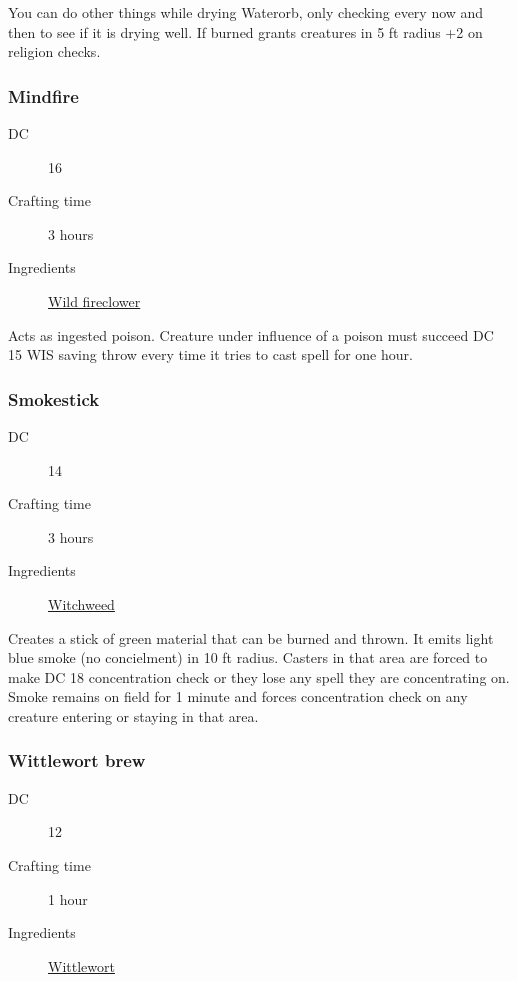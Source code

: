 You can do other things while drying Waterorb, only checking every now and then to see if it is drying well.
 If burned grants creatures in 5 ft radius +2 on religion checks.

\subsubsection{Mindfire}
\label{Mindfire}

\begin{description}
\item [DC] 16
\item [Crafting time] 3 hours
\item [Ingredients] \hyperref[Wild Fireclover]{Wild fireclower}
\end{description}

Acts as ingested poison. Creature under influence of a poison must succeed DC 15 WIS 
saving throw every time it tries to cast spell for one hour.

\subsubsection{Smokestick}
\label{Smokestick}

\begin{description}
\item [DC] 14
\item [Crafting time] 3 hours
\item [Ingredients] \hyperref[Witchweed]{Witchweed}
\end{description}

Creates a stick of green material that can be burned and thrown. It emits light blue smoke 
(no concielment) in 10 ft radius. Casters in that area are forced to make DC 18 concentration check 
or they lose any spell they are concentrating on. 
Smoke remains on field for 1 minute and forces concentration check on any creature entering or staying in that area.

\subsubsection{Wittlewort brew}
\label{Wittlewort brew}

\begin{description}
\item [DC] 12
\item [Crafting time] 1 hour
\item [Ingredients] \hyperref[Wittlewort]{Wittlewort}
\end{description}

